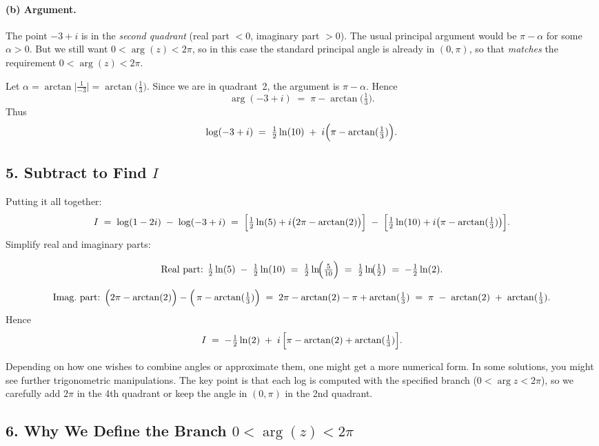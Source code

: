 \documentclass[12pt]{article}
\theoremstyle{definition} %
\theoremstyle{plain} %
\begin{document}
\paragraph{(b) Argument.}
The point $-3 + i$ is in the \emph{second quadrant} (real part $<0$, imaginary part $>0$). The usual principal argument would be $\pi - \alpha$ for some $\alpha>0$. But we still want $0<\arg(z)<2\pi$, so in this case the standard principal angle is already in $(0,\pi)$, so that \emph{matches} the requirement $0<\arg(z)<2\pi$.  

Let $\alpha=\arctan\!\bigl|\frac{1}{-3}\bigr|=\arctan\!\bigl(\tfrac{1}{3}\bigr).$  
Since we are in quadrant~2, the argument is $\pi - \alpha$.  
Hence
\[
\arg(-3 + i)
\;=\;\pi - \arctan\!\bigl(\tfrac{1}{3}\bigr).
\]
Thus
\[
\log(-3 + i)
\;=\;\tfrac12 \ln(10)
\;+\; i\Bigl(\pi - \arctan(\tfrac13)\Bigr).
\]

\subsection*{5. Subtract to Find $I$}

Putting it all together:
\[
I 
\;=\;
\log(1 - 2i)\;-\;\log(-3 + i)
\;=\;
\Bigl[\tfrac12\ln(5) + i\bigl(2\pi - \arctan(2)\bigr)\Bigr]
\;-\;
\Bigl[\tfrac12\ln(10) + i\bigl(\pi - \arctan(\tfrac13)\bigr)\Bigr].
\]
Simplify real and imaginary parts:

\[
\text{Real part: }
\tfrac12 \ln(5) \;-\;\tfrac12 \ln(10)
\;=\;\tfrac12 \ln\!\Bigl(\tfrac{5}{10}\Bigr)
\;=\;\tfrac12 \ln\!\bigl(\tfrac12\bigr)
\;=\;
-\tfrac12 \ln(2).
\]

\[
\text{Imag.\ part: }
\Bigl(2\pi - \arctan(2)\Bigr) - \Bigl(\,\pi - \arctan(\tfrac13)\Bigr)
\;=\;
2\pi - \arctan(2) - \pi + \arctan(\tfrac13)
\;=\;
\pi \;-\;\arctan(2) \;+\;\arctan(\tfrac13).
\]
Hence
\[
I
\;=\;
-\tfrac12 \ln(2)
\;+\; i\,\Bigl[\pi - \arctan(2) + \arctan(\tfrac13)\Bigr].
\]

Depending on how one wishes to combine angles or approximate them, one might get a more numerical form.  In some solutions, you might see further trigonometric manipulations.  The key point is that each log is computed with the specified branch ($0<\arg z<2\pi$), so we carefully add $2\pi$ in the 4th quadrant or keep the angle in $(0,\pi)$ in the 2nd quadrant.

\subsection*{6. Why We Define the Branch $0<\arg(z)<2\pi$}
\end{document}
